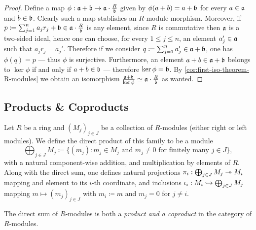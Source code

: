 \begin{proof}
Define a map
\(\phi: \mathfrak{a} + \mathfrak{b} \to \mathfrak{a} \cdot \frac{R}{\mathfrak{b}}\) given by
\(\phi(a + b) = a + \mathfrak{b}\) for every \(a \in \mathfrak{a}\) and
\(b \in \mathfrak{b}\). Clearly such a map stablishes an \(R\)-module
morphism. Moreover, if
\(p \coloneq \sum_{j=1}^n a_j r_j + \mathfrak{b} \in \mathfrak{a} \cdot
\frac{R}{\mathfrak{b}}\) is any element, since \(R\) is commutative then
\(\mathfrak{a}\) is a two-sided ideal, hence one can choose, for every
\(1 \leq j \leq n\), an element \(a_j' \in \mathfrak{a}\) such that
\(a_j r_j = a_j'\). Therefore if we consider
\(q \coloneq \sum_{j=1}^n a_j' \in \mathfrak{a} + \mathfrak{b}\), one has
\(\phi(q) = p\) --- thus \(\phi\) is surjective. Furthermore, an element
\(a + b \in \mathfrak{a} + \mathfrak{b}\) belongs to \(\ker \phi\) if and only if
\(a + b \in \mathfrak{b}\) --- therefore \(\ker \phi = \mathfrak{b}\). By
\cref{cor:first-iso-theorem-R-modules} we obtain an isomorphism
\(\frac{\mathfrak{a} + \mathfrak{b}}{\ker \phi} \simeq \mathfrak{a} \cdot
\frac{R}{\mathfrak{b}}\) as wanted.
\end{proof}

\subsection{Products \& Coproducts}

\begin{definition}
\label{def:direct-sum-modules}
Let \(R\) be a ring and \((M_j)_{j \in J}\) be a collection of \(R\)-modules
(either right or left modules). We define the direct product of this family to
be a module
\[
\bigoplus_{j \in J} M_j \coloneq
\{(m_j) \colon m_j \in M_j \text{ and } m_j \neq 0
\text{ for finitely many } j \in J\},
\]
with a natural component-wise addition, and multiplication by elements of
\(R\). Along with the direct sum, one defines natural projections
\(\pi_i: \bigoplus_{j \in J} M_j \twoheadrightarrow M_i\) mapping and element to its \(i\)-th
coordinate, and inclusions \(\iota_i: M_i \hookrightarrow \bigoplus_{j \in J} M_j\) mapping
\(m \mapsto (m_j)_{j \in J}\) with \(m_i \coloneq m\) and \(m_j = 0\) for
\(j \neq i\).
\end{definition}

\begin{theorem}
\label{thm:direct-sum-product-and-coproduct}
The direct sum of \(R\)-modules is both a \emph{product and a coproduct} in the
category of \(R\)-modules.
\end{theorem}


